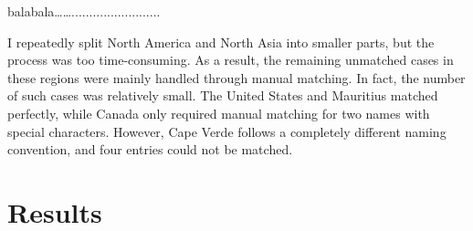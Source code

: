 \documentclass[12pt]{article}
\begin{document}
balabala…….........................

I repeatedly split North America and North Asia into smaller parts, but the process was too time-consuming. As a result, the remaining unmatched cases in these regions were mainly handled through manual matching. In fact, the number of such cases was relatively small. The United States and Mauritius matched perfectly, while Canada only required manual matching for two names with special characters. However, Cape Verde follows a completely different naming convention, and four entries could not be matched.

\section{Results}

\end{document}
